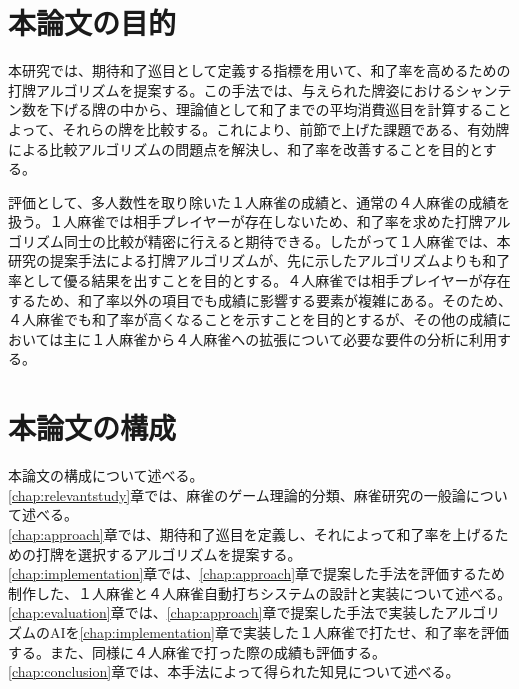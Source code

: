 \section{本論文の目的}
本研究では、期待和了巡目として定義する指標を用いて、和了率を高めるための打牌アルゴリズムを提案する。この手法では、与えられた牌姿におけるシャンテン数を下げる牌の中から、理論値として和了までの平均消費巡目を計算することよって、それらの牌を比較する。これにより、前節で上げた課題である、有効牌による比較アルゴリズムの問題点を解決し、和了率を改善することを目的とする。

評価として、多人数性を取り除いた１人麻雀の成績と、通常の４人麻雀の成績を扱う。１人麻雀では相手プレイヤーが存在しないため、和了率を求めた打牌アルゴリズム同士の比較が精密に行えると期待できる。したがって１人麻雀では、本研究の提案手法による打牌アルゴリズムが、先に示したアルゴリズムよりも和了率として優る結果を出すことを目的とする。４人麻雀では相手プレイヤーが存在するため、和了率以外の項目でも成績に影響する要素が複雑にある。そのため、４人麻雀でも和了率が高くなることを示すことを目的とするが、その他の成績においては主に１人麻雀から４人麻雀への拡張について必要な要件の分析に利用する。
\section{本論文の構成}
本論文の構成について述べる。
\\\ref{chap:relevantstudy}章では、麻雀のゲーム理論的分類、麻雀研究の一般論について述べる。
\\\ref{chap:approach}章では、期待和了巡目を定義し、それによって和了率を上げるための打牌を選択するアルゴリズムを提案する。
\\\ref{chap:implementation}章では、\ref{chap:approach}章で提案した手法を評価するため制作した、１人麻雀と４人麻雀自動打ちシステムの設計と実装について述べる。
\\\ref{chap:evaluation}章では、\ref{chap:approach}章で提案した手法で実装したアルゴリズムのAIを\ref{chap:implementation}章で実装した１人麻雀で打たせ、和了率を評価する。また、同様に４人麻雀で打った際の成績も評価する。
\\\ref{chap:conclusion}章では、本手法によって得られた知見について述べる。
